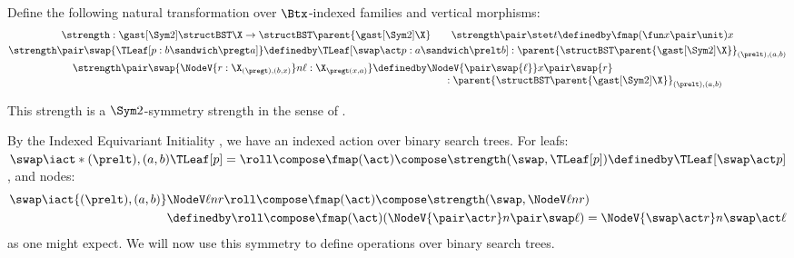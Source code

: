 Define the following natural transformation over $\Btx$-indexed
families and vertical morphisms:
\begin{gather*}
\strength : \gast[\Sym2] \structBST \X \to
\structBST\parent{\gast[\Sym2]\X}
\qquad
\strength\pair\stet t \definedby \fmap(\fun x\pair\unit) x
\\
\strength\pair\swap {\TLeaf[p : b \sandwich\pregt a]}
\definedby \TLeaf[\swap \act p : a \sandwich\prelt b] :
\parent{\structBST\parent{\gast[\Sym2]\X}}_{(\prelt), (a,b)}
\\
\strength\pair\swap
          {\NodeV {r : \X_{(\pregt), (b,x)}}n{\ell : \X_{{\pregt}{(x,a)}}}}
\definedby
\begin{array}[t]{@{}l@{}}
  \NodeV{\pair\swap{\ell}}x{\pair\swap{r}}
    \\
    \qquad: \parent{\structBST\parent{\gast[\Sym2]\X}}_{(\prelt), (a,b)}
\end{array}
\end{gather*}
\begin{proposition}
  This strength is a $\Sym2$-symmetry strength in the sense of
  .
\end{proposition}

By the Indexed Equivariant Initiality , we
have an indexed action over binary search trees. For leafs:
\(
\swap \iact*{(\prelt), (a,b)}\TLeaf[p] =
\roll \compose \fmap(\act)\compose \strength(\swap, \TLeaf[p]) \definedby
\TLeaf[\swap \act p]
\), and nodes:
\begin{align*}
\swap \iact{(\prelt), (a,b)}&\NodeV \ell n r
\roll \compose \fmap(\act)\compose \strength(\swap, \NodeV \ell n r)
\\&\definedby
\roll \compose \fmap(\act)(\NodeV{\pair\act r}n{\pair\swap\ell})
=
\NodeV{\swap \act r}n{\swap\act \ell}
\end{align*}
as one might expect. We will now use this symmetry to define
operations over binary search trees.

